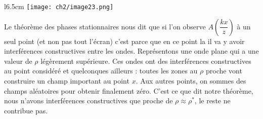 \begin{wrapfigure}[10]{l}{6.5cm}
	\vspace{-3mm}
	\texttt{[image: ch2/image23.png]}
	\end{wrapfigure}	
Le théorème des phases stationnaires nous dit que si l'on observe $A\left(\dfrac{kx}{z}
\right)$ à un seul point (et non pas tout l'écran) c'est parce que en ce point la il va 
y avoir interférences constructives entre les ondes. Représentons une onde plane qui a une 
valeur de $\rho$ légèrement supérieure. Ces ondes ont des interférences constructives au 
point considéré et quelconques ailleurs : toutes les zones au $\rho$ proche vont 
construire un champ important au point $x$. Aux autres points, on sommes des champs aléatoires 
pour obtenir finalement zéro. C'est ce que dit notre théorème, nous n'avons interférences 
constructives que proche de $\rho \approx \rho^*$, le reste ne contribue pas.
	






































